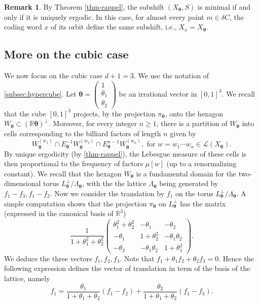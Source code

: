 \documentclass{article}
\theoremstyle{definition}
\newtheorem{remark}[lemma]{Remark}
\newcommand{\btheta}{\boldsymbol{\theta}}
\begin{document}
\begin{remark}
By Theorem \ref{thm-rappel}, the subshift $(X_{\btheta},S)$ is minimal if and  only if it is uniquely ergodic. In this case, for almost every point $m\in \delta C$, the coding word $x$ of its orbit define the same subshift, i.e., $X_x=X_{\btheta}$.
\end{remark}



\subsection{More on the cubic  case} \label{subsec:cubic}
We now focus on the cubic case $d+1=3$.
We  use the notation of  \cref{subsec:hypercube}. Let   $\btheta=\begin{pmatrix}1\\ \theta_1\\ \theta_2\end{pmatrix}$ be an irrational vector in  $[0,1]^3$.  We recall that  the cube $[0,1]^3$ projects, by the projection $\pi_{\btheta}$,     onto the hexagon  $W_{\btheta} \subset  (\mathbb R\btheta)^\perp$. Moreover,  for every integer $n\geq 1$, there is a partition of $W_{\btheta}$ into cells corresponding to the billiard factors  of length $n$
given by $$W_{\btheta}  ^{(w_1)} \cap   E_{\btheta} ^{-1}  W_{\btheta}  ^{(w_2)} \cap  E_{\btheta} ^{n-1}W_{\btheta}  ^{(w_n)}, \mbox{ for }  w=w_1 \cdots w_n \in {\mathcal
L}(X_{\btheta})  .$$  By unique ergodicity (by \cref{thm-rappel}), the Lebesgue measure of these cells is  then   proportional to the frequency of  factors $\mu[w]$
(up to a renormalizing constant).
We recall that the hexagon  $W_{\btheta}$ is  a fundamental domain for the two-dimensional  torus $L_{\btheta}^\perp/\Lambda_{\btheta}$, with the  the lattice $\Lambda_{\btheta}$ being  generated by $f_1-f_3, f_1-f_2$. Now we consider the translation by $f_1$ on the torus $L_{\btheta}^\perp/\Lambda_{\btheta}$. A simple computation shows that the projection $\pi_{\btheta}$ on $L_{\btheta}^\perp$ has the matrix (expressed in the canonical basis of ${\mathbb R}^3$)
$$\frac{1}{1+\theta_1^2+\theta_2^2}\begin{pmatrix}\theta_1^2+\theta_2^2&-\theta_1&-\theta_2\\ -\theta_1&1+\theta_2^2&-\theta_1\theta_2\\ -\theta_2&-\theta_1\theta_2&1+\theta_1^2
\end{pmatrix}.$$
We deduce the three vectors $f_1, f_2, f_3$. Note  that $f_1+\theta_1f_2+\theta_2f_3=0$.  Hence  the following expression defines the vector of translation in term of the basis of the lattice, namely  $$f_1=\frac{\theta_1}{1+\theta_1+\theta_2}(f_1-f_2)+\frac{\theta_2}{1+\theta_1+\theta_2}(f_1-f_3).$$
\end{document}
